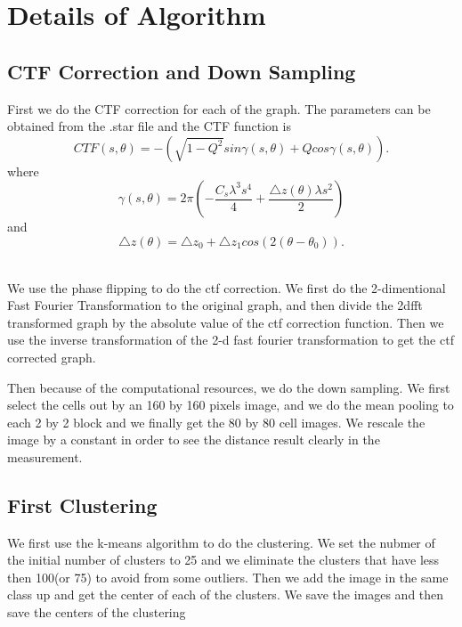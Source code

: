 \documentclass{article}
\begin{document}
\section{Details of Algorithm}
\subsection{CTF Correction and Down Sampling}

First we do the CTF correction for each of the graph. The parameters can be obtained from the .star file and the CTF function is
\begin{equation*}
	CTF(s,\theta) = -\left(\sqrt{1 - Q^2}sin\gamma(s,\theta) + Qcos\gamma(s,\theta)\right).
\end{equation*}
where
\begin{equation*}
	\gamma(s,\theta) = 2\pi \left(-\frac{C_s\lambda^3s^4}{4} + \frac{\triangle z(\theta)\lambda s^2}{2}\right)
\end{equation*}
and
\begin{equation*}
	\triangle z(\theta) = \triangle z_0 + \triangle z_1cos(2(\theta - \theta_0)).
\end{equation*}
~\\
\par
We use the phase flipping to do the ctf correction. We first do the 2-dimentional Fast Fourier Transformation to the original graph, and then divide the 2dfft transformed graph by the absolute value of the ctf correction function. Then we use the inverse transformation of the 2-d fast fourier transformation to get the ctf corrected graph.\par
Then because of the computational resources, we do the down sampling. We first select the cells out by an 160 by 160 pixels image, and we do the mean pooling to each 2 by 2 block and we finally get the 80 by 80 cell images. We rescale the image by a constant in order to see the distance result clearly in the measurement.
\subsection{First Clustering}
	We first use the k-means algorithm to do the clustering. We set the nubmer of the initial number of clusters to 25 and we eliminate the clusters that have less then 100(or 75) to avoid from some outliers. Then we add the image in the same class up and get the center of each of the clusters. We save the images and then save the centers of the clustering 
\end{document}
